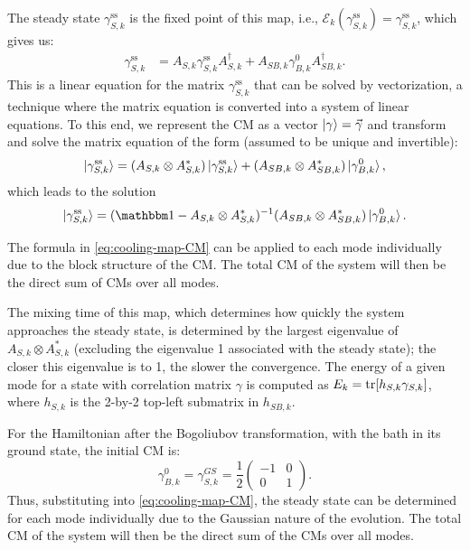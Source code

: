 The steady state $\gamma_{S,k}^\text{ss}$ is the fixed point of this map, i.e., $\mathcal{E}_k(\gamma_{S,k}^\text{ss}) = \gamma_{S,k}^\text{ss}$, which gives us:
\begin{align}
    \gamma_{S,k}^\text{ss} &= A_{S,k} \gamma_{S,k}^\text{ss} A_{S,k}^\dag + A_{SB,k} \gamma_{B,k}^{0} A_{SB,k}^\dag. \label{eq:cooling-map-CM-notvectorized}
\end{align}
This is a linear equation for the matrix $\gamma_{S,k}^\text{ss}$ that can be solved by vectorization, a technique where the matrix equation is converted into a system of linear equations. To this end, we represent the CM as a vector $\ket{\gamma} = \vec{\gamma}$ and transform and solve the matrix equation of the form (assumed to be unique and invertible):
\begin{equation}
    \ket{\gamma_{S,k}^\text{ss}} = (A_{S,k} \otimes A_{S,k}^*)\ket{\gamma_{S,k}^\text{ss}} + (A_{SB,k} \otimes A_{SB,k}^*)\ket{\gamma_{B,k}^{0}},
\end{equation}
which leads to the solution
\begin{equation}
    \ket{\gamma_{S,k}^\text{ss}} = (\Id - A_{S,k} \otimes A_{S,k}^*)^{-1}(A_{SB,k} \otimes A_{SB,k}^*)\ket{\gamma_{B,k}^{0}}.
    \label{eq:cooling-map-CM}
\end{equation}

The formula in \cref{eq:cooling-map-CM} can be applied to each mode individually due to the block structure of the CM. The total CM of the system will then be the direct sum of CMs over all modes.

The mixing time of this map, which determines how quickly the system approaches the steady state, is determined by the largest eigenvalue of $A_{S,k} \otimes A_{S,k}^*$ (excluding the eigenvalue 1 associated with the steady state); the closer this eigenvalue is to 1, the slower the convergence.
The energy of a given mode for a state with correlation matrix $\gamma$ is computed as $E_k=\operatorname{tr}[h_{S,k}\gamma_{S,k}]$, where $h_{S,k}$ is the 2-by-2 top-left submatrix in $h_{SB,k}$.

For the Hamiltonian after the Bogoliubov transformation, with the bath in its ground state, the initial CM is:
\begin{equation}
    \gamma_{B,k}^{0} = \gamma_{S,k}^{GS} = \frac{1}{2}\begin{pmatrix}
        -1 &0\\
        0  &1
    \end{pmatrix}.
    \label{eq:gamma_b=gamma_gs}
\end{equation}
Thus, substituting into \cref{eq:cooling-map-CM}, the steady state can be determined for each mode individually due to the Gaussian nature of the evolution. The total CM of the system will then be the direct sum of the CMs over all modes.


